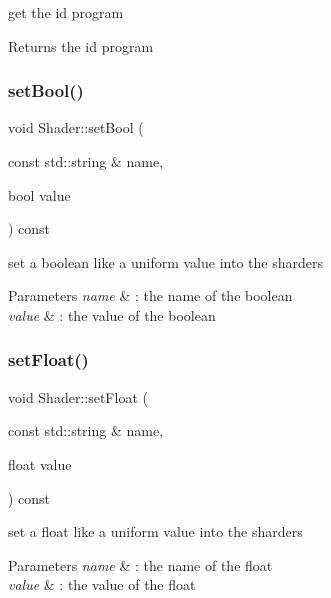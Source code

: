 get the id program 

\begin{DoxyReturn}{Returns}
the id program 
\end{DoxyReturn}
\mbox{\label{class_shader_ab1a56d6c299bd7eaa18c2e142ef7bd9f}} 
\subsubsection{\texorpdfstring{set\+Bool()}{setBool()}}
{\footnotesize\ttfamily void Shader\+::set\+Bool (\begin{DoxyParamCaption}\item[{const std\+::string \&}]{name,  }\item[{bool}]{value }\end{DoxyParamCaption}) const}



set a boolean like a uniform value into the sharders 


\begin{DoxyParams}{Parameters}
{\em name} & \+: the name of the boolean \\
\hline
{\em value} & \+: the value of the boolean \\
\hline
\end{DoxyParams}
\mbox{\label{class_shader_afe7367621f74c2d26431d8ac15252bf3}} 
\subsubsection{\texorpdfstring{set\+Float()}{setFloat()}}
{\footnotesize\ttfamily void Shader\+::set\+Float (\begin{DoxyParamCaption}\item[{const std\+::string \&}]{name,  }\item[{float}]{value }\end{DoxyParamCaption}) const}



set a float like a uniform value into the sharders 


\begin{DoxyParams}{Parameters}
{\em name} & \+: the name of the float \\
\hline
{\em value} & \+: the value of the float \\
\hline
\end{DoxyParams}
\mbox{\label{class_shader_ad362e2b654cd95a3574cd505411e41fd}} 
